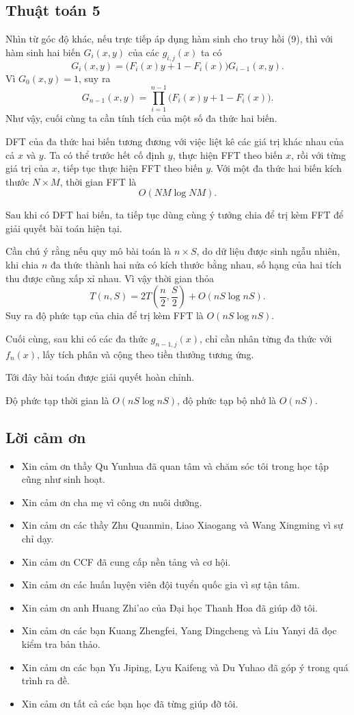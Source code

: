 \documentclass[11pt]{article}
\begin{document}
\subsection{Thuật toán 5}

Nhìn từ góc độ khác, nếu trực tiếp áp dụng hàm sinh cho truy hồi (9), thì với
hàm sinh hai biến \(G_i(x,y)\) của các \(g_{i,j}(x)\) ta có
\[
  G_i(x,y)=\bigl(F_i(x)y+1-F_i(x)\bigr)G_{i-1}(x,y). \tag{16}
\]
Vì \(G_0(x,y)=1\), suy ra
\[
  G_{n-1}(x,y)=
  \prod_{i=1}^{n-1}\bigl(F_i(x)y+1-F_i(x)\bigr). \tag{17}
\]
Như vậy, cuối cùng ta cần tính tích của một số đa thức hai biến.

DFT của đa thức hai biến tương đương với việc liệt kê các giá trị khác nhau của
cả \(x\) và \(y\). Ta có thể trước hết cố định \(y\), thực hiện FFT theo biến
\(x\), rồi với từng giá trị của \(x\), tiếp tục thực hiện FFT theo biến \(y\).
Với một đa thức hai biến kích thước \(N\times M\), thời gian FFT là
\[
  O(NM\log NM).
\]

Sau khi có DFT hai biến, ta tiếp tục dùng cùng ý tưởng chia để trị kèm FFT để
giải quyết bài toán hiện tại.

Cần chú ý rằng nếu quy mô bài toán là \(n\times S\), do dữ liệu được sinh ngẫu
nhiên, khi chia \(n\) đa thức thành hai nửa có kích thước bằng nhau, số hạng của
hai tích thu được cũng xấp xỉ nhau. Vì vậy thời gian thỏa
\[
  T(n,S)=2T\left(\frac n2,\frac S2\right)+O(nS\log nS). \tag{18}
\]
Suy ra độ phức tạp của chia để trị kèm FFT là \(O(nS\log nS)\).

Cuối cùng, sau khi có các đa thức \(g_{n-1,j}(x)\), chỉ cần nhân từng đa thức
với \(f_n(x)\), lấy tích phân và cộng theo tiền thưởng tương ứng.

Tới đây bài toán được giải quyết hoàn chỉnh.

Độ phức tạp thời gian là \(O(nS\log nS)\), độ phức tạp bộ nhớ là \(O(nS)\).

\subsection{Lời cảm ơn}

\begin{itemize}
  \item Xin cảm ơn thầy Qu Yunhua đã quan tâm và chăm sóc tôi trong học tập
  cũng như sinh hoạt.
  \item Xin cảm ơn cha mẹ vì công ơn nuôi dưỡng.
  \item Xin cảm ơn các thầy Zhu Quanmin, Liao Xiaogang và Wang Xingming vì sự chỉ
  dạy.
  \item Xin cảm ơn CCF đã cung cấp nền tảng và cơ hội.
  \item Xin cảm ơn các huấn luyện viên đội tuyển quốc gia vì sự tận tâm.
  \item Xin cảm ơn anh Huang Zhi'ao của Đại học Thanh Hoa đã giúp đỡ tôi.
  \item Xin cảm ơn các bạn Kuang Zhengfei, Yang Dingcheng và Liu Yanyi đã đọc kiểm
  tra bản thảo.
  \item Xin cảm ơn các bạn Yu Jiping, Lyu Kaifeng và Du Yuhao đã góp ý trong quá
  trình ra đề.
  \item Xin cảm ơn tất cả các bạn học đã từng giúp đỡ tôi.
\end{itemize}
\end{document}
